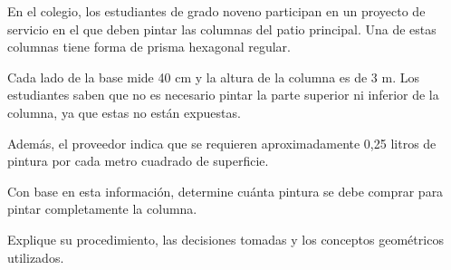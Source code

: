 En el colegio, los estudiantes de grado noveno participan en un proyecto de servicio en el que deben pintar las columnas del patio principal. Una de estas columnas tiene forma de prisma hexagonal regular.

Cada lado de la base mide 40 cm y la altura de la columna es de 3 m. Los estudiantes saben que no es necesario pintar la parte superior ni inferior de la columna, ya que estas no están expuestas.

Además, el proveedor indica que se requieren aproximadamente 0,25 litros de pintura por cada metro cuadrado de superficie.

Con base en esta información, determine cuánta pintura se debe comprar para pintar completamente la columna.

Explique su procedimiento, las decisiones tomadas y los conceptos geométricos utilizados.